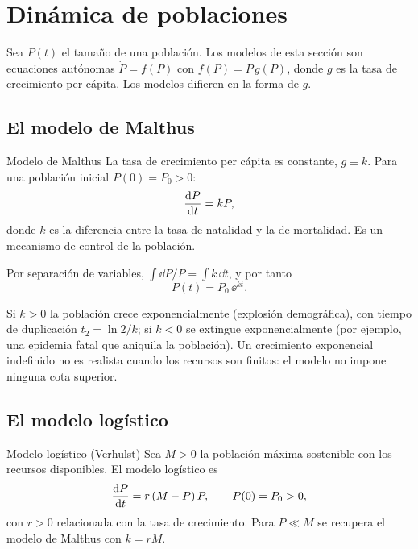 \section{Dinámica de poblaciones}\label{sec:poblaciones}

Sea $P(t)$ el tamaño de una población. Los modelos de esta sección son ecuaciones autónomas $\dot P = f(P)$ con $f(P)=P\,g(P)$, donde $g$ es la tasa de crecimiento per cápita. Los modelos difieren en la forma de $g$.

\subsection{El modelo de Malthus}

\begin{definicion}{Modelo de Malthus}
La tasa de crecimiento per cápita es constante, $g\equiv k$. Para una población inicial $P(0)=P_0>0$:
\begin{equation}
  \dfrac{\mathrm{d} P}{\mathrm{d} t} = kP,
  \label{eq:malthus}
\end{equation}
donde $k$ es la diferencia entre la tasa de natalidad y la de mortalidad. Es un mecanismo de control de la población.
\end{definicion}

Por separación de variables, $\int \dd P/P = \int k\,\dd t$, y por tanto
\begin{equation}
  P(t) = P_0\,\ee^{kt}.
  \label{eq:malthus-sol}
\end{equation}

Si $k>0$ la población crece exponencialmente (explosión demográfica), con tiempo de duplicación $t_2=\ln 2/k$; si $k<0$ se extingue exponencialmente (por ejemplo, una epidemia fatal que aniquila la población). Un crecimiento exponencial indefinido no es realista cuando los recursos son finitos: el modelo no impone ninguna cota superior.

\subsection{El modelo logístico}

\begin{definicion}{Modelo logístico (Verhulst)}
Sea $M>0$ la población máxima sostenible con los recursos disponibles. El modelo logístico es
\begin{equation}
  \dfrac{\mathrm{d} P}{\mathrm{d} t} = r\,(M-P)\,P, \qquad P(0)=P_0>0,
  \label{eq:logistica}
\end{equation}
con $r>0$ relacionada con la tasa de crecimiento. Para $P\ll M$ se recupera el modelo de Malthus con $k=rM$.
\end{definicion}

